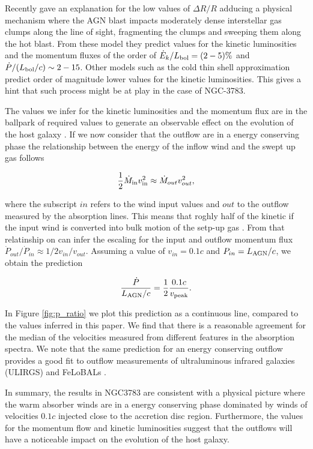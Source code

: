\documentclass{report}
\begin{document}
Recently \cite{Faucher-Giguere2012} gave an explanation for
the low values of $\Delta R/R$ adducing a physical mechanism where the AGN
blast impacts moderately dense interstellar gas clumps along the line
of sight, fragmenting the clumps and sweeping them along the hot
blast. From these model they predict values for the kinetic
luminosities and the momentum fluxes of the order of $\dot{E}_k/L_{\rm
bol}= (2-5)\%$ and $\dot{P}/(L_{\rm bol}/c)\sim 2-15$. Other models
such as the cold thin shell approximation predict order of magnitude
lower values for the kinetic luminosities. This gives a hint that such
process might be at play in the case of NGC-3783. 

The values we infer for the kinetic luminosities and the momentum flux
are in the ballpark of required values to generate an observable
effect on the evolution of the host galaxy
\cite{DiMatteo2005,Debuhr2012}. If we now consider that the outflow 
are in a energy conserving phase the relationship between the energy
of the inflow wind and the swept up gas follows 

\begin{equation}
\frac{1}{2}\dot{M}_{\rm in}v_{\rm in}^2 \approx \dot{M}_{out}v_{out}^2, 
\end{equation}

where the subscript $in$ refers to the wind input values and $out$ to
the outflow measured by the absorption lines. This means that
roghly half of the kinetic if the input wind is converted into bulk
motion of the setp-up gas  \cite{FaucherGiguere2012}. From that
relatinship on can infer the escaling for the input and outflow
momentum flux $\dot{P}_{out}/\dot{P}_{in}\approx 1/2
v_{in}/v_{out}$. Assuming a value of $v_{in}=0.1c$ and $P_{in}=L_{\rm
  AGN}/c$, we obtain the prediction

\begin{equation}
\frac{\dot{P}}{L_{\rm AGN}/c} = \frac{1}{2}\frac{0.1c}{v_{\rm peak}}.
\end{equation}

In Figure \ref{fig:p_ratio} we plot this prediction as a continuous
line, compared to the values inferred in this paper. We find that
there is a reasonable agreement for the median of the velocities
measured from different features in the absorption spectra. We note
that the same prediction for an energy conserving outflow provides a
good fit to outflow measurements of ultraluminous infrared galaxies
(ULIRGS) and FeLoBALs \cite{FaucherGiguere2012}.

In summary, the results in NGC3783 are consistent with a physical
picture where the warm absorber winds are in a energy conserving phase
dominated by winds of velocities $0.1c$ injected close to the accretion
disc region. Furthermore, the values for the momentum flow and kinetic
luminosities suggest that the outflows will have a noticeable impact
on the evolution of the host galaxy.
\end{document}

